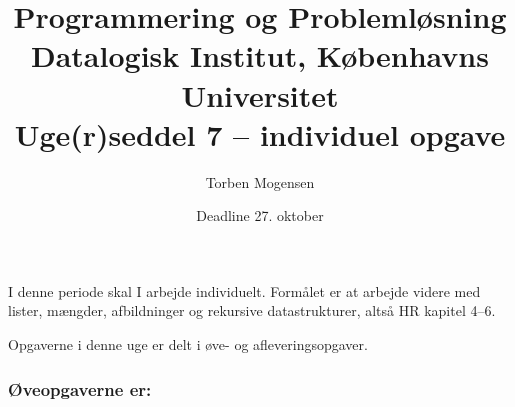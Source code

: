 \documentclass[a4paper]{article}
\begin{document}
\title{Programmering og Problemløsning\\
Datalogisk Institut, Københavns Universitet\\
Uge(r)seddel 7 -- individuel opgave}

\author{Torben Mogensen}
\date{Deadline 27. oktober}

\maketitle

\noindent
I denne periode skal I arbejde individuelt.  Formålet er at arbejde
videre med lister, mængder, afbildninger og rekursive datastrukturer,
altså HR kapitel 4--6.

Opgaverne i denne uge er delt i øve- og afleveringsopgaver.

\subsubsection*{Øveopgaverne er:}
\end{document}
